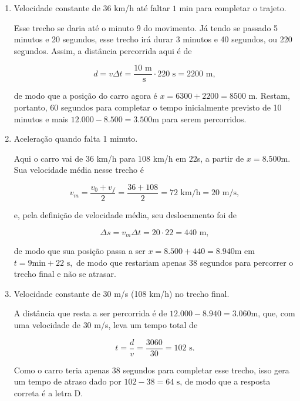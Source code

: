 \begin{exemplo}
\begin{enumerate}
    $$ \Delta s = v_m \Delta t = 15 \cdot 20 = 300 \text{ m}, $$

    \noindent de modo que sua posição passa a ser $x=6.000+300=6300$m em $t=5\text{min} + 20\text{ s}.$


     \item [(ii)] Velocidade constante de $36$ km/h até faltar $1$ min para completar o trajeto.

     Esse trecho se daria até o minuto 9 do movimento. Já tendo se passado 5 minutos e 20 segundos, esse trecho irá durar 3 minutos e 40 segundos, ou 220 segundos. Assim, a distância percorrida aqui é de

     $$ d = v\Delta t= \dfrac{10 \text{ m}}{\text{ s}} \cdot 220 \text{ s} = 2200 \text{ m},$$

     \noindent de modo que a posição do carro agora é $x=6300+2200=8500 \text{ m}.$ Restam, portanto, 60 segundos para completar o tempo inicialmente previsto de 10 minutos e mais $12.000-8.500=3.500 \text{m}$ para serem percorridos.

     


      \item [(iii)] Aceleração quando falta 1 minuto.

       Aqui o carro vai de $36$ km/h para $108$ km/h em $22$s, a partir de $x=8.500$m. Sua velocidade média nesse trecho é

    $$ v_m = \dfrac{v_0+v_f}{2} = \dfrac{36+108}{2}= 72 \text{ km/h} = 20 \text{ m/s},$$

    \noindent e, pela definição de velocidade média, seu deslocamento foi de

    $$ \Delta s = v_m \Delta t = 20 \cdot 22 = 440 \text{ m}, $$

    \noindent de modo que sua posição passa a ser $x=8.500+440=8.940$m em $t=9\text{min} + 22\text{ s},$ de modo que restariam apenas 38 segundos para percorrer o trecho final e não se atrasar.
      

      \item [(iv)] Velocidade constante de $30$ m/s (108 km/h) no trecho final.

      A distância que resta a ser percorrida é de $12.000-8.940=3.060$m, que, com uma velocidade de $30$ m/s, leva um tempo total de 

      $$ t = \dfrac{d}{v} = \dfrac{3060}{30} = 102 \text{ s}.$$

      Como o carro teria apenas $38$ segundos para completar esse trecho, isso gera um tempo de atraso dado por $102-38=64\text{ s,}$ de modo que a resposta correta é a letra D.
\end{enumerate}
  
\end{exemplo}

\vspace{0.3cm}
